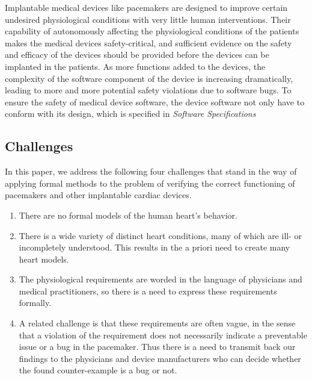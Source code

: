 
Implantable medical devices like pacemakers are designed to improve certain undesired physiological conditions with very little human interventions. Their capability of autonomously affecting the physiological conditions of the patients makes the medical devices safety-critical, and sufficient evidence on the safety and efficacy of the devices should be provided before the devices can be implanted in the patients. As more functions added to the devices, the complexity of the software component of the device is increasing dramatically, leading to more and more potential safety violations due to software bugs. To ensure the safety of medical device software, the device software not only have to conform with its design, which is specified in \emph{Software Specifications}

\subsection{Challenges}
In this paper, we address the following four challenges that stand in the way of applying formal methods to the problem of verifying the correct functioning of pacemakers and other implantable cardiac devices.

\begin{enumerate}
	\item There are no formal models of the human heart's behavior.
	\item There is a wide variety of distinct heart conditions, many of which are ill- or incompletely understood.
	This results in the a priori need to create many heart models.
	\item The physiological requirements are worded in the language of physicians and medical practitioners, so there is a need to express these requirements formally.
	\item A related challenge is that these requirements are often vague, in the sense that a violation of the requirement does not necessarily indicate a preventable issue or a bug in the pacemaker. 
	Thus there is a need to transmit back our findings to the physicians and device manufacturers who can decide whether the found counter-example is a bug or not.
\end{enumerate}

